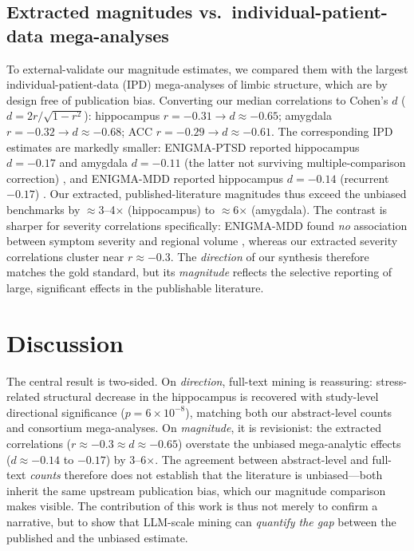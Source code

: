\documentclass[11pt]{article}
\begin{document}
\subsection{Extracted magnitudes vs.\ individual-patient-data mega-analyses}
To external-validate our magnitude estimates, we compared them with the largest
individual-patient-data (IPD) mega-analyses of limbic structure, which are by
design free of publication bias. Converting our median correlations to Cohen's
$d$ ($d = 2r/\sqrt{1-r^2}$): hippocampus $r=-0.31 \to d\approx-0.65$; amygdala
$r=-0.32 \to d\approx-0.68$; ACC $r=-0.29 \to d\approx-0.61$. The corresponding
IPD estimates are markedly smaller: ENIGMA-PTSD reported hippocampus $d=-0.17$
and amygdala $d=-0.11$ (the latter not surviving multiple-comparison correction)
\cite{logue2018}, and ENIGMA-MDD reported hippocampus $d=-0.14$ (recurrent
$-0.17$) \cite{schmaal2016}. Our extracted, published-literature magnitudes thus
exceed the unbiased benchmarks by $\approx$3--4$\times$ (hippocampus) to
$\approx$6$\times$ (amygdala). The contrast is sharper for severity correlations
specifically: ENIGMA-MDD found \emph{no} association between symptom severity and
regional volume \cite{schmaal2016}, whereas our extracted severity correlations
cluster near $r\approx-0.3$. The \emph{direction} of our synthesis therefore
matches the gold standard, but its \emph{magnitude} reflects the selective
reporting of large, significant effects in the publishable literature.

\section{Discussion}

The central result is two-sided. On \emph{direction}, full-text mining is
reassuring: stress-related structural decrease in the hippocampus is recovered
with study-level directional significance ($p=6\times10^{-8}$), matching both our
abstract-level counts and consortium mega-analyses. On \emph{magnitude}, it is
revisionist: the extracted correlations ($r\approx-0.3 \approx d\approx-0.65$)
overstate the unbiased mega-analytic effects ($d\approx-0.14$ to $-0.17$) by
3--6$\times$. The agreement between abstract-level and full-text \emph{counts}
therefore does not establish that the literature is unbiased---both inherit the
same upstream publication bias, which our magnitude comparison makes visible. The
contribution of this work is thus not merely to confirm a narrative, but to show
that LLM-scale mining can \emph{quantify the gap} between the published and the
unbiased estimate.
\end{document}
